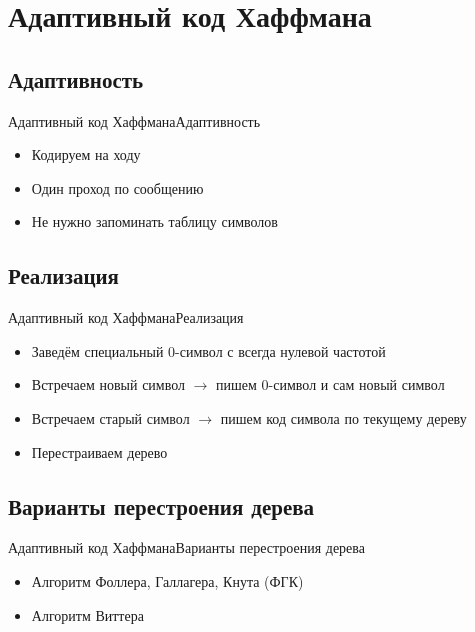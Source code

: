 \documentclass[10pt]{beamer}
\begin{document}
\section{Адаптивный код Хаффмана}
\subsection{Адаптивность}
\begin{frame}[fragile]{Адаптивный код Хаффмана}{Адаптивность}
\begin{itemize}
    \item Кодируем на ходу
    \item Один проход по сообщению
    \item Не нужно запоминать таблицу символов
\end{itemize}
\end{frame}

\subsection{Реализация}
\begin{frame}[fragile]{Адаптивный код Хаффмана}{Реализация}
\begin{itemize}
    \item Заведём специальный 0-символ с всегда нулевой частотой
    \item Встречаем новый символ $\rightarrow$ пишем 0-символ и сам новый символ
    \item Встречаем старый символ $\rightarrow$ пишем код символа по текущему дереву
    \item Перестраиваем дерево
\end{itemize}
\end{frame}

\subsection{Варианты перестроения дерева}
\begin{frame}[fragile]{Адаптивный код Хаффмана}{Варианты перестроения дерева}
\begin{itemize}
    \item Алгоритм Фоллера, Галлагера, Кнута (ФГК)
    \item Алгоритм Виттера
\end{itemize}
\end{frame}
\end{document}
